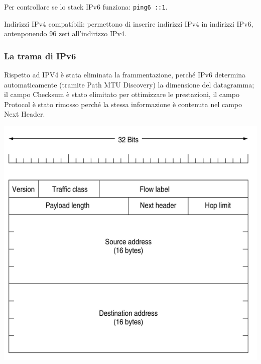             Per controllare se lo stack IPv6 funziona: \verb-ping6 ::1-.
        
            Indirizzi IPv4 compatibili: permettono di inserire indirizzi IPv4 in indirizzi IPv6, antenponendo 96 zeri all'indirizzo IPv4.

        \subsubsection{La trama di IPv6}
            Rispetto ad IPV4 è stata eliminata la frammentazione, perché IPv6 determina automaticamente (tramite Path MTU Discovery) la dimensione del datagramma; il campo Checksum è stato elimitato per ottimizzare le prestazioni, il campo Protocol è stato rimosso perché la stessa informazione è contenuta nel campo Next Header.

            \begin{center}
                \includegraphics[scale=0.5]{chapters/4/assets/schema_k.png}
            \end{center}

